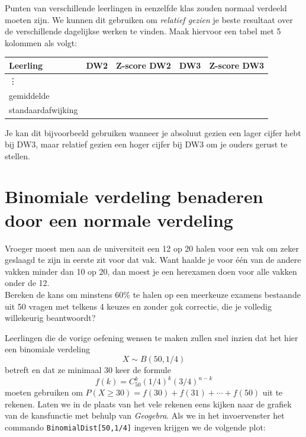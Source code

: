 \documentclass[a4paper,12pt, twoside]{article}
\begin{document}
\begin{oefening}
Punten van verschillende leerlingen in eenzelfde klas zouden normaal verdeeld moeten zijn. We kunnen dit gebruiken om {\em relatief gezien} je beste resultaat over de verschillende dagelijkse werken te vinden. Maak hiervoor een tabel met 5 kolommen als volgt:
\begin{center}
  \begin{tabular}{l|c|c|c|c}
  Leerling & DW2 & Z-score DW2 & DW3 & Z-score DW3\\
  \hline
  \vdots&&&&\\
  \hline
  gemiddelde&&&&\\
  standaardafwijking&&&&\\
  \end{tabular}
\end{center}
Je kan dit bijvoorbeeld gebruiken wanneer je absoluut gezien een lager cijfer hebt bij DW3, maar relatief gezien een hoger cijfer bij DW3 om je ouders gerust te stellen.
\end{oefening}

\pagebreak
\section{Binomiale verdeling benaderen door een normale verdeling}

\begin{oefening}
Vroeger moest men aan de universiteit een 12 op 20 halen voor een vak om zeker geslaagd te zijn in eerste zit voor dat vak. Want haalde je voor één van de andere vakken minder dan 10 op 20, dan moest je een herexamen doen voor alle vakken onder de 12.\\
Bereken de kans om minstens 60\% te halen op een meerkeuze examens bestaande uit 50 vragen met telkens 4 keuzes en zonder gok correctie, die je volledig willekeurig beantwoordt?
\end{oefening}

Leerlingen die de vorige oefening wensen te maken zullen snel inzien dat het hier een binomiale verdeling
$$X\sim B(50, 1/4)$$
betreft en dat ze minimaal 30 keer de formule
$$f(k)=C_{50}^{k}(1/4)^k(3/4)^{n-k}$$
moeten gebruiken om $P(X\geq 30)=f(30)+f(31)+\cdots +f(50)$ uit te rekenen. Laten we in de plaats van het vele rekenen eens kijken naar de grafiek van de kansfunctie met behulp van {\em Geogebra}. Als we in het invoervenster het commando \verb#BinomialDist[50,1/4]# ingeven krijgen we de volgende plot:
\end{document}
